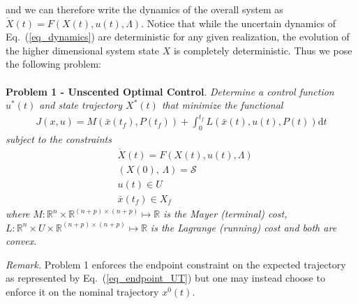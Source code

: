 \documentclass[10pt,a4paper]{article}
\begin{document}
	and we can therefore write the dynamics of the overall system as $\dot{X}(t) = F(X(t),u(t),\Lambda)$. Notice that while the uncertain dynamics of Eq.~(\ref{eq_dynamics}) are deterministic for any given realization, the evolution of the higher dimensional system state $X$ is completely deterministic. Thus we pose the following problem:
	\\\\
	\textbf{Problem 1 - Unscented Optimal Control}. \textit{Determine a control function $ u^*(t) $ and state trajectory $ X^*(t) $ that minimize the functional}
		\begin{align}
		J(x,u) = M(\bar{x}(t_f),P(t_f)) + \int_{0}^{t_f}L(\bar{x}(t),u(t),P(t))\mathrm{d}t
		\end{align}
		\textit{subject to the constraints }
		\begin{align}
		&\dot{X}(t) = F(X(t),u(t),\Lambda) \\
		&(X(0),\,\Lambda) = \mathcal{S} \\
		&u(t) \in U \\
		&\bar{x}(t_f) \in X_f \label{eq_endpoint_UT}
		\end{align}
	\textit{where} $ M:\mathbb{R}^{n}\times\mathbb{R}^{(n+p)\times (n+p)}\mapsto \mathbb{R} $ \textit{is the Mayer (terminal) cost,} $L:\mathbb{R}^{n}\times U\times\mathbb{R}^{(n+p)\times (n+p)}\mapsto\mathbb{R}$ \textit{ is the Lagrange (running) cost and both are convex.}
		
	\textit{Remark.} Problem 1 enforces the endpoint constraint on the expected trajectory as represented by Eq.~(\ref{eq_endpoint_UT}) but one may instead choose to enforce it on the nominal trajectory $x^0(t)$.
	
	
		
	
	
\end{document}
